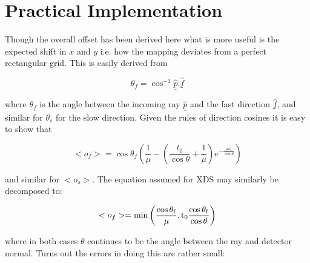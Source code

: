 \documentclass{article}
\begin{document}
\section{Practical Implementation}

Though the overall offset has been derived here what is more useful is
the expected shift in $x$ and $y$ i.e. how the mapping deviates from a
perfect rectangular grid. This is easily derived from 

\begin{equation}
\theta_f = \cos^{-1} \underline{\hat{p}}.\underline{\hat{f}}
\end{equation}

\noindent
where $\theta_f$ is the angle between the incoming ray
$\underline{\hat{p}}$ and the fast direction $\underline{\hat{f}}$,
and similar for $\theta_s$ for the slow direction. Given the rules of
direction cosines it is easy to show that

\begin{equation}
<o_f> = \cos \theta_f \left( \frac{1}{\mu} - \left( \frac{t_0}{\cos
      \theta} + \frac{1}{\mu} \right) e^{- \frac{\mu t_0}{\cos \theta}} \right)
\end{equation}

\noindent 
and similar for $<o_s>$. The equation assumed for XDS may similarly be
decomposed to:

\begin{equation}
<o_f> = \rm{min}\left(\frac{\cos \theta_f}{\mu}, t_0 \frac{\cos
    \theta_f}{\cos \theta} \right)
\end{equation}

\noindent
where in both cases $\theta$ continues to be the angle between the ray
and detector normal. Turns out the errors in doing this are rather small:
\end{document}
